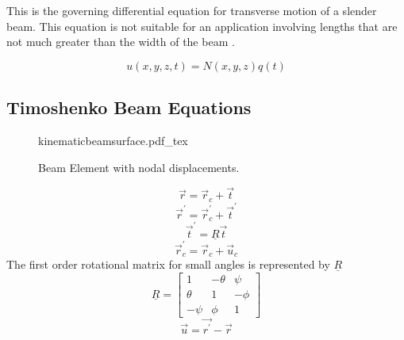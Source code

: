 This is the governing differential equation for transverse motion of a slender beam. This equation is not suitable for an application involving lengths that are not much greater than the width of the beam \cite{genta2007dynamics}.

\begin{equation} \label{eq:FEGoverning}
u(x,y,z,t)=N(x,y,z)q(t)
\end{equation}

\subsection{Timoshenko Beam Equations}

\begin{figure}
	\centering
	\def\svgwidth{400pt}
	{kinematicbeamsurface.pdf_tex}
	\caption{Beam Element with nodal displacements.}
	\label{fig:KineBeamElem}
\end{figure}
\begin{equation}\label{eq:r}
\vec{r}=\vec{r}_c+\vec{t}
\end{equation}
\begin{equation}\label{eq:rprime}
\vec{r}^\prime=\vec{r}_c^\prime+\vec{t}^\prime
\end{equation}
\begin{equation}\label{eq:trot}
\vec{t}^\prime=\underline{R}\vec{t}
\end{equation}
\begin{equation}\label{eq:rtrans}
\vec{r}_c^\prime=\vec{r}_c+\vec{u}_c
\end{equation}
The first order rotational matrix for small angles is represented by $\underline{R}$
\begin{equation}\label{eq:RotTransformation}
\underline{R}=\left[\begin{array}{ccc}
1&-\theta&\psi\\
\theta&1&-\phi\\
-\psi&\phi&1
\end{array}\right]
\end{equation}
\begin{equation}\label{eq:DispVectorrpr}
\vec{u}=\vec{r^\prime}-\vec{r}
\end{equation}
